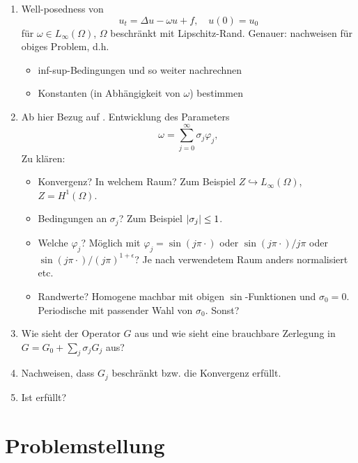 \begin{enumerate}
    \item Well-posedness von
    \begin{equation}
        u_{t} = \Delta u - \omega u + f, \quad u(0) = u_{0}
    \end{equation}
    für $\omega \in L_{\infty}(\Omega)$, $\Omega$ beschränkt mit Lipschitz-Rand.
    Genauer: \cite[Theorem 5.1]{Schwab:2009ec}  nachweisen für obiges Problem, d.h.
    \begin{itemize}
        \item inf-sup-Bedingungen und so weiter nachrechnen 
        \item Konstanten (in Abhängigkeit von $\omega$) bestimmen 
    \end{itemize}
    \item {}Ab hier Bezug auf \cite{Kunoth:2013ef}.
        Entwicklung des Parameters
    \begin{equation}
        \omega = \sum_{j = 0}^{\infty} \sigma_{j} \varphi_{j},
    \end{equation}
    Zu klären:
    \begin{itemize}
        \item Konvergenz? In welchem Raum? Zum Beispiel $Z \hookrightarrow L_{\infty}(\Omega)$, $Z = H^{1}(\Omega)$.
        \item Bedingungen an $\sigma_{j}$? Zum Beispiel $\lvert\sigma_{j}\rvert \leq 1$.
        \item Welche $\varphi_{j}$? Möglich mit $\varphi_{j} = \sin(j \pi \cdot)$ oder $\sin(j \pi \cdot) / j \pi$ oder $\sin(j \pi \cdot) / (j \pi)^{1 + \epsilon}$? Je nach verwendetem Raum anders normalisiert etc.
        \item Randwerte? Homogene machbar mit obigen $\sin$-Funktionen und $\sigma_{0} = 0$. Periodische mit passender Wahl von $\sigma_{0}$. Sonst?
    \end{itemize}
    \item Wie sieht der Operator $G$ aus und wie sieht eine brauchbare Zerlegung in $G = G_{0} + \sum_{j} \sigma_{j} G_{j}$ aus?
    \item Nachweisen, dass $G_{j}$ beschränkt bzw. die Konvergenz erfüllt.
    \item Ist \cite[Assumption 2]{Kunoth:2013ef} erfüllt?
\end{enumerate}

\section{Problemstellung} %
\label{sub:problemstellung}

